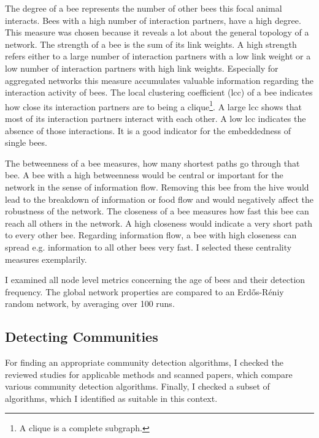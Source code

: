 The degree of a bee represents the number of other bees this focal animal interacts.
Bees with a high number of interaction partners, have a high degree.
This measure was chosen because it reveals a lot about the general topology of a network.
The strength of a bee is the sum of its link weights. A high strength refers either to a large number of interaction partners with a low link weight or a low number of interaction partners with high link weights. Especially for aggregated networks this measure accumulates valuable information regarding the interaction activity of bees.
The local clustering coefficient (lcc) of a bee indicates how close its interaction partners are to being a clique\footnote{A clique is a complete subgraph.}. A large lcc shows that most of its interaction partners interact with each other. A low lcc indicates the absence of those interactions.
It is a good indicator for the embeddedness of single bees.

The betweenness of a bee measures, how many shortest paths go through that bee. A bee with a high betweenness would be central or important for the network in the sense of information flow. Removing this bee from the hive would lead to the breakdown of information or food flow and would negatively affect the robustness of the network.
The closeness of a bee measures how fast this bee can reach all others in the network. A high closeness would indicate a very short path to every other bee. Regarding information flow, a bee with high closeness can spread e.g. information to all other bees very fast.
I selected these centrality measures exemplarily.

I examined all node level metrics concerning the age of bees and their detection frequency. The global network properties are compared to an Erd\H{o}s-R\'{e}niy  random network, by averaging over 100 runs.



\subsection{Detecting Communities}
\label{subsec:APcommunityDet}
For finding an appropriate community detection algorithms, I checked the reviewed studies for applicable methods and scanned papers, which compare various community detection algorithms. Finally, I checked a subset of algorithms, which I identified as suitable in this context.

